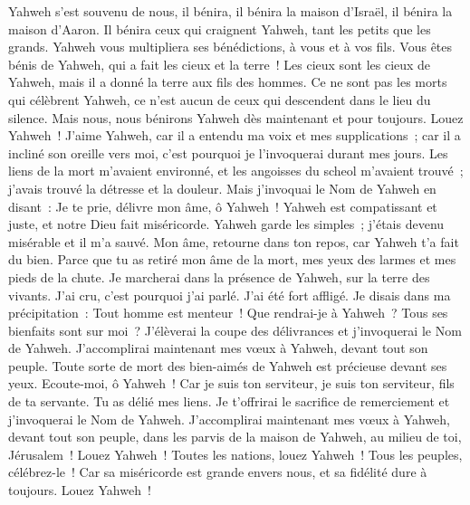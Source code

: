 \begin{multicols}{2}
Yahweh s'est souvenu de nous, il bénira, il bénira la maison d'Israël, il bénira la maison d'Aaron.
Il bénira ceux qui craignent Yahweh, tant les petits que les grands.
Yahweh vous multipliera ses bénédictions, à vous et à vos fils.
Vous êtes bénis de Yahweh, qui a fait les cieux et la terre~!
Les cieux sont les cieux de Yahweh, mais il a donné la terre aux fils des hommes.
Ce ne sont pas les morts qui célèbrent Yahweh, ce n'est aucun de ceux qui descendent dans le lieu du silence.
Mais nous, nous bénirons Yahweh dès maintenant et pour toujours. Louez Yahweh~!
\VerseOne{}J'aime Yahweh, car il a entendu ma voix et mes supplications~;
car il a incliné son oreille vers moi, c'est pourquoi je l'invoquerai durant mes jours.
Les liens de la mort m'avaient environné, et les angoisses du scheol m'avaient trouvé~; j'avais trouvé la détresse et la douleur.
Mais j'invoquai le Nom de Yahweh en disant~: Je te prie, délivre mon âme, ô Yahweh~!
Yahweh est compatissant et juste, et notre Dieu fait miséricorde.
Yahweh garde les simples~; j'étais devenu misérable et il m'a sauvé.
Mon âme, retourne dans ton repos, car Yahweh t'a fait du bien.
Parce que tu as retiré mon âme de la mort, mes yeux des larmes et mes pieds de la chute.
Je marcherai dans la présence de Yahweh, sur la terre des vivants.
J'ai cru, c'est pourquoi j'ai parlé. J'ai été fort affligé.
Je disais dans ma précipitation~: Tout homme est menteur~!
Que rendrai-je à Yahweh~? Tous ses bienfaits sont sur moi~?
J'élèverai la coupe des délivrances et j'invoquerai le Nom de Yahweh.
J'accomplirai maintenant mes vœux à Yahweh, devant tout son peuple.
Toute sorte de mort des bien-aimés de Yahweh est précieuse devant ses yeux.
Ecoute-moi, ô Yahweh~! Car je suis ton serviteur, je suis ton serviteur, fils de ta servante. Tu as délié mes liens.
Je t'offrirai le sacrifice de remerciement et j'invoquerai le Nom de Yahweh.
J'accomplirai maintenant mes vœux à Yahweh, devant tout son peuple,
dans les parvis de la maison de Yahweh, au milieu de toi, Jérusalem~! Louez Yahweh~!
\VerseOne{}Toutes les nations, louez Yahweh~! Tous les peuples, célébrez-le~!
Car sa miséricorde est grande envers nous, et sa fidélité dure à toujours. Louez Yahweh~!

\end{multicols}
